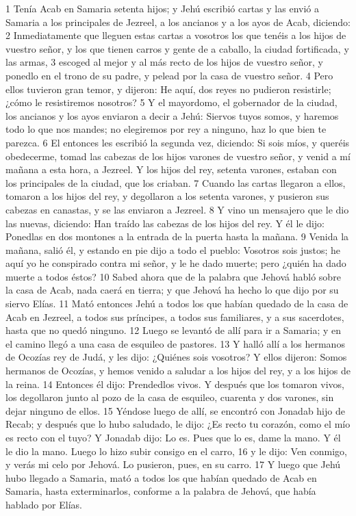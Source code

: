 1 Tenía Acab en Samaria setenta hijos; y Jehú escribió cartas y las envió a Samaria a los principales de Jezreel, a los ancianos y a los ayos de Acab, diciendo:
2 Inmediatamente que lleguen estas cartas a vosotros los que tenéis a los hijos de vuestro señor, y los que tienen carros y gente de a caballo, la ciudad fortificada, y las armas,
3 escoged al mejor y al más recto de los hijos de vuestro señor, y ponedlo en el trono de su padre, y pelead por la casa de vuestro señor.
4 Pero ellos tuvieron gran temor, y dijeron: He aquí, dos reyes no pudieron resistirle; ¿cómo le resistiremos nosotros?
5 Y el mayordomo, el gobernador de la ciudad, los ancianos y los ayos enviaron a decir a Jehú: Siervos tuyos somos, y haremos todo lo que nos mandes; no elegiremos por rey a ninguno, haz lo que bien te parezca.
6 El entonces les escribió la segunda vez, diciendo: Si sois míos, y queréis obedecerme, tomad las cabezas de los hijos varones de vuestro señor, y venid a mí mañana a esta hora, a Jezreel. Y los hijos del rey, setenta varones, estaban con los principales de la ciudad, que los criaban.
7 Cuando las cartas llegaron a ellos, tomaron a los hijos del rey, y degollaron a los setenta varones, y pusieron sus cabezas en canastas, y se las enviaron a Jezreel.
8 Y vino un mensajero que le dio las nuevas, diciendo: Han traído las cabezas de los hijos del rey. Y él le dijo: Ponedlas en dos montones a la entrada de la puerta hasta la mañana.
9 Venida la mañana, salió él, y estando en pie dijo a todo el pueblo: Vosotros sois justos; he aquí yo he conspirado contra mi señor, y le he dado muerte; pero ¿quién ha dado muerte a todos éstos?
10 Sabed ahora que de la palabra que Jehová habló sobre la casa de Acab, nada caerá en tierra; y que Jehová ha hecho lo que dijo por su siervo Elías.
11 Mató entonces Jehú a todos los que habían quedado de la casa de Acab en Jezreel, a todos sus príncipes, a todos sus familiares, y a sus sacerdotes, hasta que no quedó ninguno.
12 Luego se levantó de allí para ir a Samaria; y en el camino llegó a una casa de esquileo de pastores.
13 Y halló allí a los hermanos de Ocozías rey de Judá, y les dijo: ¿Quiénes sois vosotros? Y ellos dijeron: Somos hermanos de Ocozías, y hemos venido a saludar a los hijos del rey, y a los hijos de la reina.
14 Entonces él dijo: Prendedlos vivos. Y después que los tomaron vivos, los degollaron junto al pozo de la casa de esquileo, cuarenta y dos varones, sin dejar ninguno de ellos.
15 Yéndose luego de allí, se encontró con Jonadab hijo de Recab; y después que lo hubo saludado, le dijo: ¿Es recto tu corazón, como el mío es recto con el tuyo? Y Jonadab dijo: Lo es. Pues que lo es, dame la mano. Y él le dio la mano. Luego lo hizo subir consigo en el carro,
16 y le dijo: Ven conmigo, y verás mi celo por Jehová. Lo pusieron, pues, en su carro.
17 Y luego que Jehú hubo llegado a Samaria, mató a todos los que habían quedado de Acab en Samaria, hasta exterminarlos, conforme a la palabra de Jehová, que había hablado por Elías.

